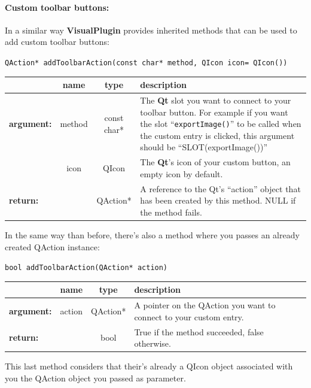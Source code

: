 \documentclass[a4paper]{scrreprt}
\begin{document}
	\paragraph{Custom toolbar buttons:}
	In a similar way \textbf{VisualPlugin} provides inherited methods that can be
	used to add custom toolbar buttons:
	\begin{center}
		\texttt{QAction* addToolbarAction(const char* method, QIcon icon= QIcon())}
	\begin{tabular}{|l|c|c|p{}|}
		\hline
		~ & name & type & description
		\\ \hline
		\textbf{argument:} & method & const char* &
			The \textbf{Qt} slot you want to connect to your toolbar button. For example
			if you want the slot ``\texttt{exportImage()}'' to be called when the custom
			entry is clicked, this argument should be ``SLOT(exportImage())''
		\\ \cline{2-4}
		~ & icon & QIcon &
			The \textbf{Qt}'s icon of your custom button, an empty icon by default.
		\\ \hline
		\textbf{return:} & ~ & QAction* &
			A reference to the Qt's ``action'' object that has been created by this
			method. NULL if the method fails.
		\\ \hline
	\end{tabular}
	\end{center}
	In the same way than before, there's also a method where you passes an already
	created QAction instance:
	\begin{center}
		\texttt{bool addToolbarAction(QAction* action)}
	\begin{tabular}{|l|c|c|p{}|}
		\hline
		~ & name & type & description
		\\ \hline
		\textbf{argument:} & action & QAction* &
			A pointer on the QAction you want to connect to your custom entry.
		\\ \hline
		\textbf{return:} & ~ & bool &
			True if the method succeeded, false otherwise.
		\\ \hline		
	\end{tabular}
	\end{center}
	This last method considers that their's already a QIcon object associated with
	you the QAction object you passed as parameter.
	
\end{document}

